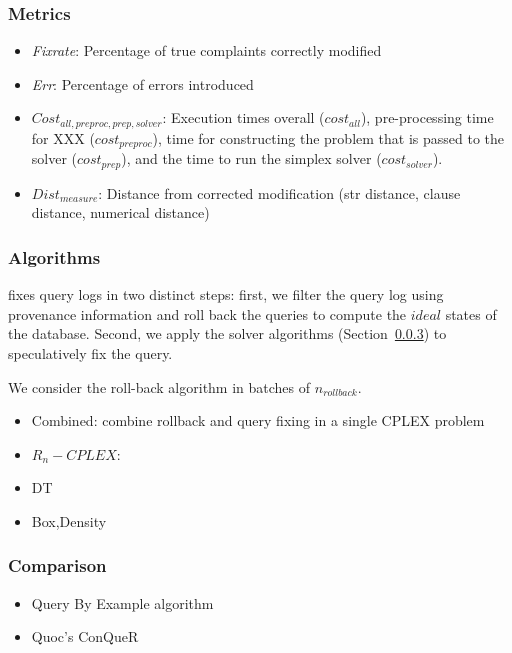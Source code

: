 \subsubsection{Metrics}

\begin{itemize}
\item {\it Fixrate}: Percentage of true complaints correctly modified
\item {\it Err}: Percentage of errors introduced
\item {\it $Cost_{all,preproc,prep,solver}$}: Execution times overall ($cost_{all}$), 
      pre-processing time for XXX ($cost_{preproc}$), time for constructing the problem that is
      passed to the solver ($cost_{prep}$), and the time to run the simplex solver ($cost_{solver}$).
\item {\it $Dist_{measure}$}: Distance from corrected modification  
      (str distance, clause distance, numerical distance)
\end{itemize}

\subsubsection{Algorithms}

\sys fixes query logs in two distinct steps: first, we filter the query log using 
provenance information and roll back the queries to compute the $ideal$ states of the database.
Second, we apply the solver algorithms (Section~\ref{}) to speculatively fix the query.

We consider the roll-back algorithm in batches of $n_{rollback}$.

\begin{itemize}
\item Combined:  combine rollback and query fixing in a single CPLEX problem
\item $R_n-CPLEX$: 
\item DT
\item Box,Density
\end{itemize}



\subsubsection{Comparison}

\begin{itemize}
\item Query By Example algorithm
\item Quoc's ConQueR
\end{itemize}

